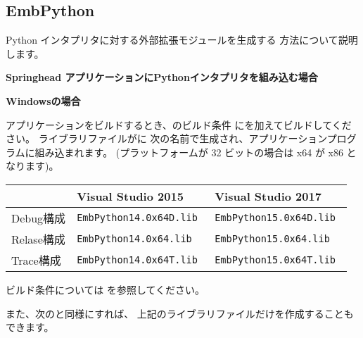 \newpage
\subsection{EmbPython}
\label{subsec:EmbPython}
\parindent=0pt

Python インタプリタに対する外部拡張モジュールを生成する 方法について説明します。

\medskip
\thinrule{\linewidth}

\noindent
\bf{Springhead アプリケーションにPythonインタプリタを組み込む場合}

\bigskip
\bf{Windowsの場合}
\begin{narrow}
	アプリケーションをビルドするとき、\QCMakeSettings{}のビルド条件
	にを加えてビルドしてください。
	ライブラリファイルがに
	次の名前で生成され、アプリケーションプログラムに組み込まれます。
 	(プラットフォームが 32 ビットの場合は x64 が x86 となります)。
	
	\medskip
	\begin{narrow}[10pt]
	\begin{tabular}{l@{\ \ ---\ \ }ll}\hline
	    & Visual Studio 2015 & Visual Studio 2017 \\\hline
	    Debug構成 & \tt{EmbPython14.0x64D.lib} & \tt{EmbPython15.0x64D.lib} \\
	    Relase構成 & \tt{EmbPython14.0x64.lib} & \tt{EmbPython15.0x64.lib} \\
	    Trace構成 & \tt{EmbPython14.0x64T.lib} & \tt{EmbPython15.0x64T.lib} \\\hline
	\end{tabular}
	\end{narrow}

	\bigskip
	ビルド条件については
	を参照してください。

	また、次のと同様にすれば、
	上記のライブラリファイルだけを作成することもできます。
\end{narrow}

